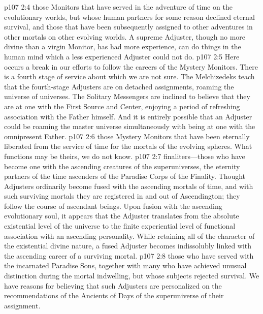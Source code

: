 \pc \vs p107 2:4 \bibnobreakspace {} those Monitors that have served in the adventure of time on the evolutionary worlds, but whose human partners for some reason declined eternal survival, and those that have been subsequently assigned to other adventures in other mortals on other evolving worlds. A supreme Adjuster, though no more divine than a virgin Monitor, has had more experience, can do things in the human mind which a less experienced Adjuster could not do.
\pc \vs p107 2:5 \bibnobreakspace {} Here occurs a break in our efforts to follow the careers of the Mystery Monitors. There is a fourth stage of service about which we are not sure. The Melchizedeks teach that the fourth\hyp{}stage Adjusters are on detached assignments, roaming the universe of universes. The Solitary Messengers are inclined to believe that they are at one with the First Source and Center, enjoying a period of refreshing association with the Father himself. And it is entirely possible that an Adjuster could be roaming the master universe simultaneously with being at one with the omnipresent Father.
\pc \vs p107 2:6 \bibnobreakspace {} those Mystery Monitors that have been eternally liberated from the service of time for the mortals of the evolving spheres. What functions may be theirs, we do not know.
\pc \vs p107 2:7 \bibnobreakspace {}finaliters---those who have become one with the ascending creatures of the superuniverses, the eternity partners of the time ascenders of the Paradise Corps of the Finality. Thought Adjusters ordinarily become fused with the ascending mortals of time, and with such surviving mortals they are registered in and out of Ascendington; they follow the course of ascendant beings. Upon fusion with the ascending evolutionary soul, it appears that the Adjuster translates from the absolute existential level of the universe to the finite experiential level of functional association with an ascending personality. While retaining all of the character of the existential divine nature, a fused Adjuster becomes indissolubly linked with the ascending career of a surviving mortal.
\pc \vs p107 2:8 \bibnobreakspace {} those who have served with the incarnated Paradise Sons, together with many who have achieved unusual distinction during the mortal indwelling, but whose subjects rejected survival. We have reasons for believing that such Adjusters are personalized on the recommendations of the Ancients of Days of the superuniverse of their assignment.
